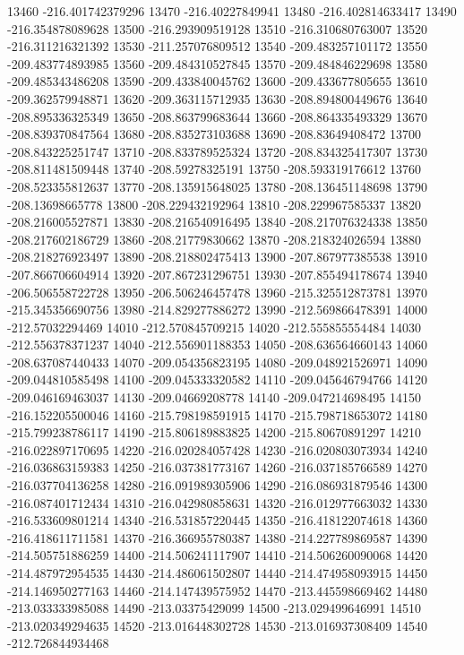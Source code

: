 {13460 -216.401742379296
13470 -216.40227849941
13480 -216.402814633417
13490 -216.354878089628
13500 -216.293909519128
13510 -216.310680763007
13520 -216.311216321392
13530 -211.257076809512
13540 -209.483257101172
13550 -209.483774893985
13560 -209.484310527845
13570 -209.484846229698
13580 -209.485343486208
13590 -209.433840045762
13600 -209.433677805655
13610 -209.362579948871
13620 -209.363115712935
13630 -208.894800449676
13640 -208.895336325349
13650 -208.863799683644
13660 -208.864335493329
13670 -208.839370847564
13680 -208.835273103688
13690 -208.83649408472
13700 -208.843225251747
13710 -208.833789525324
13720 -208.834325417307
13730 -208.811481509448
13740 -208.59278325191
13750 -208.593319176612
13760 -208.523355812637
13770 -208.135915648025
13780 -208.136451148698
13790 -208.13698665778
13800 -208.229432192964
13810 -208.229967585337
13820 -208.216005527871
13830 -208.216540916495
13840 -208.217076324338
13850 -208.217602186729
13860 -208.21779830662
13870 -208.218324026594
13880 -208.218276923497
13890 -208.218802475413
13900 -207.867977385538
13910 -207.866706604914
13920 -207.867231296751
13930 -207.855494178674
13940 -206.506558722728
13950 -206.506246457478
13960 -215.325512873781
13970 -215.345356690756
13980 -214.829277886272
13990 -212.569866478391
14000 -212.57032294469
14010 -212.570845709215
14020 -212.555855554484
14030 -212.556378371237
14040 -212.556901188353
14050 -208.636564660143
14060 -208.637087440433
14070 -209.054356823195
14080 -209.048921526971
14090 -209.044810585498
14100 -209.045333320582
14110 -209.045646794766
14120 -209.046169463037
14130 -209.04669208778
14140 -209.047214698495
14150 -216.152205500046
14160 -215.798198591915
14170 -215.798718653072
14180 -215.799238786117
14190 -215.806189883825
14200 -215.80670891297
14210 -216.022897170695
14220 -216.020284057428
14230 -216.020803073934
14240 -216.036863159383
14250 -216.037381773167
14260 -216.037185766589
14270 -216.037704136258
14280 -216.091989305906
14290 -216.086931879546
14300 -216.087401712434
14310 -216.042980858631
14320 -216.012977663032
14330 -216.533609801214
14340 -216.531857220445
14350 -216.418122074618
14360 -216.418611711581
14370 -216.366955780387
14380 -214.227789869587
14390 -214.505751886259
14400 -214.506241117907
14410 -214.506260090068
14420 -214.487972954535
14430 -214.486061502807
14440 -214.474958093915
14450 -214.146950277163
14460 -214.147439575952
14470 -213.445598669462
14480 -213.033333985088
14490 -213.03375429099
14500 -213.029499646991
14510 -213.020349294635
14520 -213.016448302728
14530 -213.016937308409
14540 -212.726844934468
}
